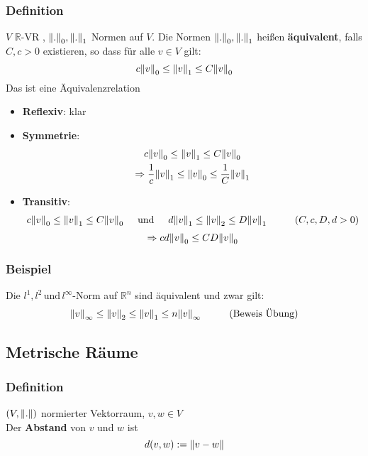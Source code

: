 \subsubsection[Äquivalenz von Normen]{Definition} %
\label{ssub:definition}
$ V$ $\mathbb{R}$-VR , $\norm{.}_0 , \norm{.}_1$ Normen auf $ V$. Die Normen $\norm{.}_0 , \norm{.}_1$ heißen {\bfseries äquivalent}, falls $C,c>0$ existieren, so dass für alle $v \in  V$ gilt:
\[
	c \norm{v}_0 \leq \norm{v}_1 \leq C \norm{v}_0 
\] 
 Das ist eine Äquivalenzrelation
\begin{itemize}
	\item {\bfseries Reflexiv}: klar
	\item {\bfseries Symmetrie}: \begin{gather*}
		c \norm{v}_0 \leq \norm{v}_1 \leq C \norm{v}_0 \\
		\Rightarrow \frac{1}{c} \norm{v}_1 \leq \norm{v}_0 \leq \frac{1}{C} \norm{v}_1
	\end{gather*}
	\item {\bfseries Transitiv}: \begin{gather*}
		c \norm{v}_0 \leq \norm{v}_1 \leq C \norm{v}_0 \hspace{0.5cm} \text{und}\hspace{0.5cm} d \norm{v}_1 \leq \norm{v}_2 \leq D \norm{v}_1  \hspace{1cm} (C,c,D,d > 0)	\end{gather*}
		\[
		\Rightarrow cd \norm{v}_0 \leq CD \norm{v}_0
		\]
\end{itemize}

\subsubsection[Beispiel Äquivalente Normen]{Beispiel} %
\label{ssub:beispiel}
Die $l^1, l^2 \, \text{und} \, l^{\infty}$-Norm auf $\mathbb{R}^n $ sind äquivalent und zwar gilt:
\[
	\norm{v}_{\infty} \leq \norm{v}_2 \leq \norm{v}_1 \leq n \norm{v}_{\infty} \hspace{1cm} \text{(Beweis Übung)}
\]

\subsection{Metrische Räume} %
\label{sub:metrische_raume}

\subsubsection[Abstand]{Definition} %
\label{ssub:definition}
$(V,\norm{.})$ normierter Vektorraum, $v,w \in  V$ \\
Der {\bfseries Abstand} von $v$ und $w$ ist \[
d(v,w):= \norm{v-w}	
\] 
